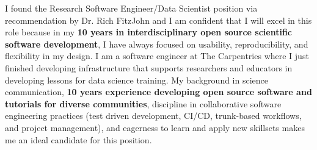 


\vspace{1ex}

I found the Research Software Engineer/Data Scientist position via
recommendation by Dr. Rich FitzJohn and I am confident that I will excel in
this role because in my \textbf{10 years in interdisciplinary open source
scientific software development}, I have always focused on usability,
reproducibility, and flexibility in my design.
I am a software engineer at The Carpentries where I just finished developing
infrastructure that supports researchers and educators in developing lessons
for data science training. 
My background in science communication, \textbf{10 years experience developing
open source software and tutorials for diverse communities}, discipline in
collaborative software engineering practices (test driven development, CI/CD,
trunk-based workflows, and project management), and eagerness to learn and
apply new skillsets makes me an ideal candidate for this position.

